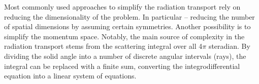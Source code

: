 Most commonly used approaches to simplify the radiation transport rely 
on reducing the dimensionality of the problem. In particular -- 
reducing the number of spatial dimensions by assuming certain symmetries.
Another possibility is to simplify the momentum space. 
%
%
Notably, the main source of complexity in the radiation transport stems from the scattering 
integral over all 4$\pi$ steradian.
By dividing the solid angle into a number of discrete angular intervals (rays), the 
integral can be replaced with a finite sum, converting the integrodifferential equation 
into a linear system of equations. %
%
